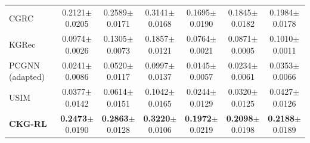 \documentclass[letterpaper]{article}
\newcommand{\sd}[1]{{\footnotesize$\pm$#1}}
\begin{document}
\begin{table}[t]
\begin{tabular*}{\textwidth}{@{\extracolsep{\fill}}lcccccc}
CGRC & 0.2121\sd{0.0205} & 0.2589\sd{0.0171} & 0.3141\sd{0.0168} & 0.1695\sd{0.0190} & 0.1845\sd{0.0182} & 0.1984\sd{0.0178} \\
KGRec & 0.0974\sd{0.0026} & 0.1305\sd{0.0073} & 0.1857\sd{0.0121} & 0.0764\sd{0.0021} & 0.0871\sd{0.0005} & 0.1010\sd{0.0011} \\
PCGNN (adapted) & 0.0241\sd{0.0086} & 0.0520\sd{0.0117} & 0.0997\sd{0.0137} & 0.0145\sd{0.0057} & 0.0234\sd{0.0061} & 0.0353\sd{0.0066} \\
USIM & 0.0377\sd{0.0142} & 0.0614\sd{0.0151} & 0.1042\sd{0.0165} & 0.0244\sd{0.0129} & 0.0320\sd{0.0125} & 0.0427\sd{0.0126} \\
\textbf{CKG-RL} & \textbf{0.2473}\sd{0.0190} & \textbf{0.2863}\sd{0.0128} & \textbf{0.3220}\sd{0.0106} & \textbf{0.1972}\sd{0.0219} & \textbf{0.2098}\sd{0.0198} & \textbf{0.2188}\sd{0.0189} \\
\bottomrule
\end{tabular*}
\end{table}
\end{document}
